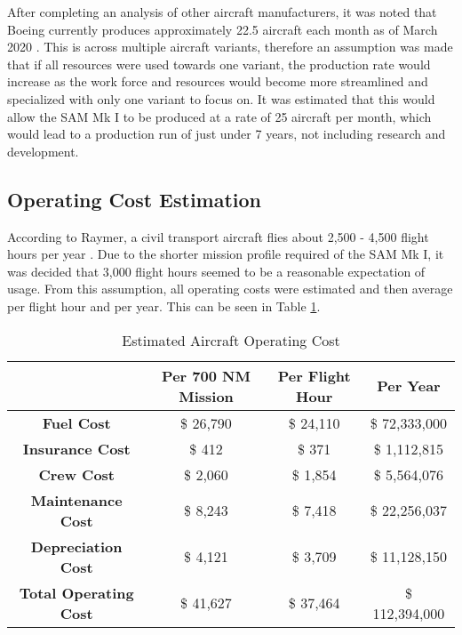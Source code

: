 After completing an analysis of other aircraft manufacturers, it was noted that Boeing currently produces approximately 22.5 aircraft each month as of March 2020 \cite{boeingproduction}. This is across multiple aircraft variants, therefore an assumption was made that if all resources were used towards one variant, the production rate would increase as the work force and resources would become more streamlined and specialized with only one variant to focus on. It was estimated that this would allow the SAM Mk I to be produced at a rate of 25 aircraft per month, which would lead to a production run of just under 7 years, not including research and development.


\subsection{Operating Cost Estimation}

According to Raymer, a civil transport aircraft flies about 2,500 - 4,500 flight hours per year \cite{raymer}. Due to the shorter mission profile required of the SAM Mk I, it was decided that 3,000 flight hours seemed to be a reasonable expectation of usage. From this assumption, all operating costs were estimated and then average per flight hour and per year. This can be seen in Table \ref{tab:opcost}.

\begin{table}[!h]
    \centering
        \caption{Estimated Aircraft Operating Cost}
    \begin{tabular}{|c||c|c|c|}\toprule
         & \textbf{Per 700 NM Mission} & \textbf{Per Flight Hour} & \textbf{Per Year} \\\hline \hline
         \textbf{Fuel Cost} & \$ 26,790 & \$ 24,110 & \$ 72,333,000 \\ \hline
         \textbf{Insurance Cost} & \$ 412 & \$ 371 & \$ 1,112,815 \\ \hline
         \textbf{Crew Cost} &  \$ 2,060  & \$ 1,854 & \$ 5,564,076 \\ \hline
         \textbf{Maintenance Cost} & \$ 8,243 & \$ 7,418 & \$ 22,256,037  \\ \hline
         \textbf{Depreciation Cost} & \$ 4,121 & \$ 3,709 & \$ 11,128,150  \\ \hline
         \textbf{Total Operating Cost} &  \$ 41,627 &  \$ 37,464 &  \$ 112,394,000 \\\bottomrule
    \end{tabular}
    \label{tab:opcost}
\end{table}

